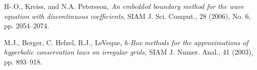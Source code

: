 \documentclass[10pt,a4paper,twoside, french]{article}
\numberwithin{equation}{section}
\numberwithin{figure}{section}
\numberwithin{table}{section}
\begin{document}








\begin{thebibliography}{0}

H-.O., Kreiss, and N.A. Petersson,
\emph{An embedded boundary method for the wave equation with discontinuous coefficients},
SIAM J. Sci. Comput., 28 (2006), No. 6, pp. 2054--2074.

M.J., Berger, C. Helzel, R.J., LeVeque,
\emph{h-Box methods for the approximations of hyperbolic conservation laws on irregular grids,}
SIAM J. Numer. Anal., 41 (2003), pp. 893--918.


\end{thebibliography}	
	
\end{document}
